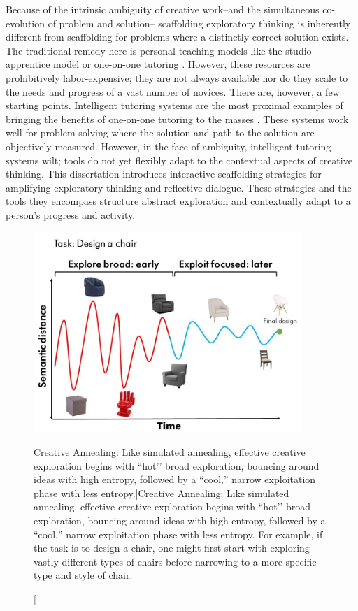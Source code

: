Because of the intrinsic ambiguity of creative work--and the simultaneous co-evolution of problem and solution-- scaffolding exploratory thinking is inherently different from scaffolding for problems where a distinctly correct solution exists. The traditional remedy here is personal teaching models like the studio-apprentice model \cite{schon1984reflective} or one-on-one tutoring \cite{bloom1984, Chi2001}. However, these resources are prohibitively labor-expensive; they are not always available nor do they scale to the needs and progress of a vast number of novices. There are, however, a few starting points. Intelligent tutoring systems are the most proximal examples of bringing the benefits of one-on-one tutoring to the masses \cite{Anderson1995, Koedinger1997}. These systems work well for problem-solving where the solution and path to the solution are objectively measured. However, in the face of ambiguity, intelligent tutoring systems wilt; tools do not yet flexibly adapt to the contextual aspects of creative thinking. This dissertation introduces interactive scaffolding strategies for amplifying exploratory thinking and reflective dialogue. These strategies and the tools they encompass structure abstract exploration and contextually adapt to a person’s progress and activity. 


\begin{figure}[b!]
\centering
  \includegraphics[width=0.9\textwidth]{i_figures/sim-ann.jpg}
  \caption[Creative Annealing: Like simulated annealing, effective creative exploration begins with ``hot’’ broad exploration, bouncing around ideas with high entropy, followed by a ``cool,'' narrow exploitation phase with less entropy.]{Creative Annealing: Like simulated annealing, effective creative exploration begins with ``hot’’ broad exploration, bouncing around ideas with high entropy, followed by a ``cool,'' narrow exploitation phase with less entropy. For example, if the task is to design a chair, one might first start with exploring vastly different types of chairs before narrowing to a more specific type and style of chair.}
  \label{fig:sim-ann}
\end{figure}

